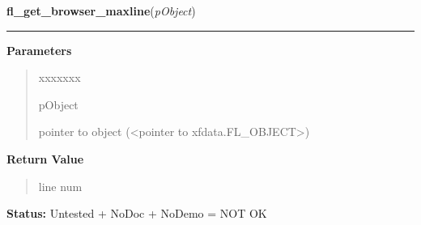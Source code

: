 \hspace{.8\funcindent}\begin{boxedminipage}{\funcwidth}

    \raggedright \textbf{fl\_get\_browser\_maxline}(\textit{pObject})

    \vspace{-1.5ex}

    \rule{\textwidth}{0.5\fboxrule}
\setlength{\parskip}{2ex}
\setlength{\parskip}{1ex}
      \textbf{Parameters}
      \vspace{-1ex}

      \begin{quote}
        \begin{Ventry}{xxxxxxx}

          \item[pObject]

          pointer to object ({\textless}pointer to 
          xfdata.FL\_OBJECT{\textgreater})

        \end{Ventry}

      \end{quote}

      \textbf{Return Value}
    \vspace{-1ex}

      \begin{quote}
      line num

      \end{quote}

\textbf{Status:} Untested + NoDoc + NoDemo = NOT OK



    \end{boxedminipage}

    \label{xformslib:library:fl_get_browser_screenlines}

    \vspace{0.5ex}

